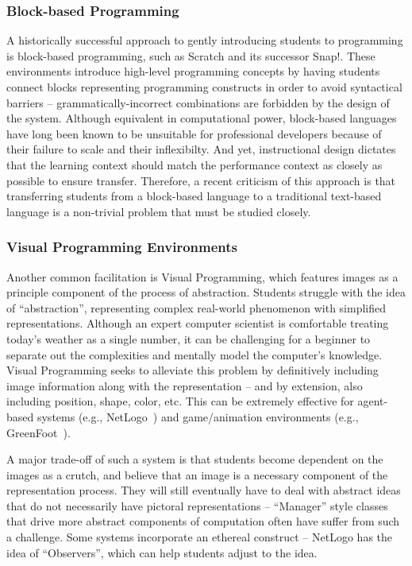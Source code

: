 \subsubsection{Block-based Programming}

A historically successful approach to gently introducing students to programming is block-based programming, such as Scratch and its successor Snap!.
These environments introduce high-level programming concepts by having students connect blocks representing programming constructs in order to avoid syntactical barriers -- grammatically-incorrect combinations are forbidden by the design of the system.
Although equivalent in computational power, block-based languages have long been known to be unsuitable for professional developers because of their failure to scale and their inflexibilty. 
And yet, instructional design dictates that the learning context should match the performance context as closely as possible to ensure transfer.
Therefore, a recent criticism of this approach is that transferring students from a block-based language to a traditional text-based language is a non-trivial problem that must be studied closely.

\subsubsection{Visual Programming Environments}

Another common facilitation is Visual Programming, which features images as a principle component of the process of abstraction.
Students struggle with the idea of ``abstraction'', representing complex real-world phenomenon with simplified representations.
Although an expert computer scientist is comfortable treating today's weather as a single number, it can be challenging for a beginner to separate out the complexities and mentally model the computer's knowledge.
Visual Programming seeks to alleviate this problem by definitively including image information along with the representation -- and by extension, also including position, shape, color, etc.
This can be extremely effective for agent-based systems (e.g., NetLogo~\cite{tisue2004netlogo}) and game/animation environments (e.g., GreenFoot~\cite{Kolling:2010}).

A major trade-off of such a system is that students become dependent on the images as a crutch, and believe that an image is a necessary component of the representation process.
They will still eventually have to deal with abstract ideas that do not necessarily have pictoral representations -- ``Manager'' style classes that drive more abstract components of computation often have suffer from such a challenge.
Some systems incorporate an ethereal construct -- NetLogo has the idea of ``Observers'', which can help students adjust to the idea.

